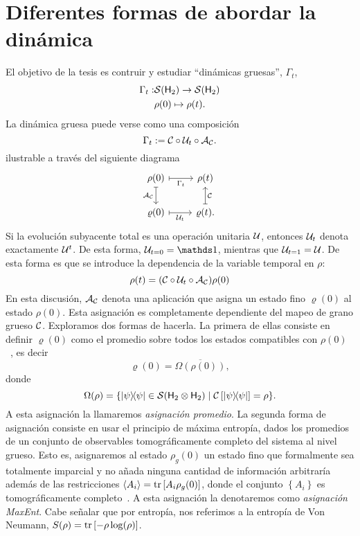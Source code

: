 \section{Diferentes formas de abordar la dinámica}
El objetivo de la tesis es contruir y estudiar ``dinámicas gruesas'', $\Gamma_t$,
\begin{align*}
\Gamma_{t}:&\mathcal{S}({\sf H}_2)\rightarrow \mathcal{S}({\sf H}_2)\\
&\rho(0) \mapsto \rho(t).
\end{align*}
La dinámica gruesa puede verse como una composición
\begin{equation*}
\Gamma_t:=\mathcal{C} \circ \mathcal{U}_t \circ \mathcal{A}_{\mathcal{C}}.
\end{equation*}
ilustrable a través del siguiente diagrama
\[\begin{tikzcd}[arrows={<-|}]
\rho(0)  & \rho(t) \arrow{l}{\Gamma_{t}} \arrow{d}{\mcC}\\
\varrho(0) \arrow{u}{\mcA_{\mcC}} & \varrho(t). \arrow{l}{\mcU_{t}}
\end{tikzcd}
\]
Si la evolución subyacente total es una operación unitaria $\mathcal{U}$, entonces $\mathcal{U}_{t}$  denota exactamente $\mathcal{U}^{t}$. De esta forma, $\mcU_{t=0}=\Id$, mientras que  $\mathcal{U}_{t=1}=\mathcal{U}$. De esta forma es que se introduce la dependencia de la variable temporal en $\rho$:
\begin{equation*}
\rho(t)=(\mathcal{C} \circ \mathcal{U}_t \circ \mathcal{A}_{\mathcal{C}})\rho(0)
\end{equation*}
En esta discusión, $\mathcal{A}_{\mathcal{C}}$ denota una aplicación que asigna un estado fino $\varrho(0)$ al estado $\rho(0)$. Esta asignación es completamente dependiente del mapeo de grano grueso $\mathcal{C}$. Exploramos dos formas de hacerla. La primera de ellas consiste en definir $\varrho(0)$ como el promedio sobre todos los estados compatibles con $\rho(0)$~\cite{Macro-To-Micro}, es decir
$$\varrho(0)=\overline{\Omega(\rho(0))},$$
donde
\begin{equation*}
\Omega(\rho)=\{\dyad{\psi}\in \mcS(\hilbert_2 \otimes \hilbert_2) \mid \mcC\left[\dyad{\psi}\right]=\rho\}.
\end{equation*}
A esta asignación la llamaremos \textit{asignación promedio}. La segunda forma de asignación consiste en usar el principio de máxima entropía, dados los promedios de un conjunto de observables tomográficamente completo del sistema al nivel grueso. Esto es, asignaremos al estado $\rho_g(0)$ un estado fino que formalmente sea totalmente imparcial y no añada ninguna cantidad de información arbitraría además de las restricciones $\langle A_i \rangle=\tr \left[ A_i \rho_g(0) \right]$, donde el conjunto $\left\{A_i \right\}$ es tomográficamente completo~\cite{jaynes}. A esta asignación la denotaremos como \textit{asignación MaxEnt}. Cabe señalar que por entropía, nos referimos a la entropía de Von Neumann, $S(\rho)=\tr \left[ -\rho \log(\rho) \right]$.